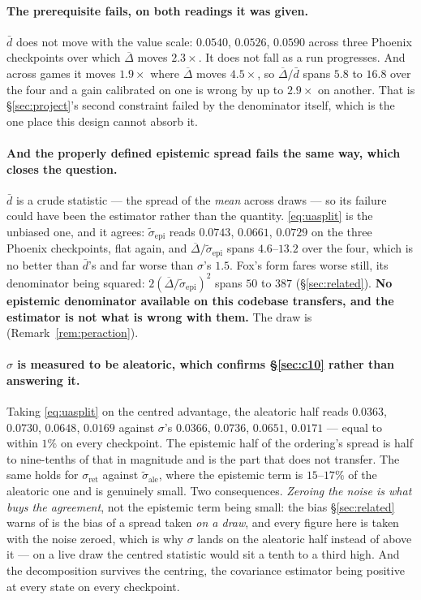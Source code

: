 \documentclass{article}
\newcommand{\gapbar}{\overline{\Delta}}
\newcommand{\dbar}{\bar{d}}
\newcommand{\sret}{\sigma_{\mathrm{ret}}}
\newcommand{\srank}{\sigma}
\begin{document}
\paragraph{The prerequisite fails, on both readings it was given.} $\dbar$ does not move with the
value scale: $0.0540$, $0.0526$, $0.0590$ across three Phoenix checkpoints over which $\gapbar$
moves $2.3\times$. It does not fall as a run progresses. And across games it moves $1.9\times$
where $\gapbar$ moves $4.5\times$, so $\gapbar/\dbar$ spans $5.8$ to $16.8$ over the four and a
gain calibrated on one is wrong by up to $2.9\times$ on another. That is \S\ref{sec:project}'s
second constraint failed by the denominator itself, which is the one place this design cannot
absorb it.

\paragraph{And the properly defined epistemic spread fails the same way, which closes the
question.} $\dbar$ is a crude statistic --- the spread of the \emph{mean} across draws --- so
its failure could have been the estimator rather than the quantity. \eqref{eq:uasplit} is the
unbiased one, and it agrees: $\tilde\sigma_{\mathrm{epi}}$ reads $0.0743$, $0.0661$, $0.0729$ on
the three Phoenix checkpoints, flat again, and $\gapbar/\tilde\sigma_{\mathrm{epi}}$ spans
$4.6$--$13.2$ over the four, which is no better than $\dbar$'s and far worse than $\srank$'s
$1.5$.
Fox's form fares worse still, its denominator being squared: $2(\gapbar/\tilde\sigma_{\mathrm{epi}})^2$
spans $50$ to $387$ (\S\ref{sec:related}). \textbf{No epistemic denominator available on this
codebase transfers, and the estimator is not what is wrong with them.} The draw is
(Remark~\ref{rem:peraction}).

\paragraph{$\srank$ is measured to be aleatoric, which confirms \S\ref{sec:c10} rather than
answering it.} Taking \eqref{eq:uasplit} on the centred advantage, the aleatoric half reads
$0.0363$, $0.0730$, $0.0648$, $0.0169$ against $\srank$'s $0.0366$, $0.0736$, $0.0651$, $0.0171$
--- equal to within $1\%$ on every checkpoint. The epistemic half of the ordering's spread is
half to nine-tenths of that in magnitude and is the part that does not transfer. The same holds
for $\sret$ against $\tilde\sigma_{\mathrm{ale}}$, where the epistemic term is $15$--$17\%$ of
the aleatoric one and is genuinely small. Two consequences. \emph{Zeroing the noise is what buys
the agreement}, not the epistemic term being small: the bias \S\ref{sec:related} warns of is the
bias of a spread taken \emph{on a draw}, and every figure here is taken with the noise zeroed,
which is why $\srank$ lands on the aleatoric half instead of above it --- on a live draw the
centred statistic would sit a tenth to a third high. And the decomposition survives the centring,
the covariance estimator being positive at every state on every checkpoint.
\end{document}
